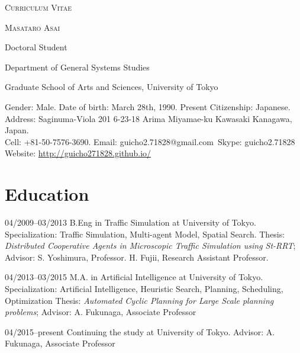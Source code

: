 \documentclass[letterpaper,12pt]{article}
\begin{document}
\pagestyle{empty}

\begin{center}
\huge{\textsc{Curriculum Vitae}}
\vspace{0.7\baselineskip}

\Large{\textsc{Masataro Asai}}
\vspace{0.5\baselineskip}

\large{
Doctoral Student

Department of General Systems Studies

Graduate School of Arts and Sciences, University of Tokyo
}

\vspace{0.8\baselineskip}

\normalsize{
 Gender: Male. Date of birth: March 28th, 1990. Present Citizenship: Japanese. \\
 Address: Saginuma-Viola 201 6-23-18 Arima Miyamae-ku Kawasaki Kanagawa, Japan. \\
 Cell: +81-50-7576-3690. Email: guicho2.71828@gmail.com\ Skype: guicho2.71828\\
 Website: \url{http://guicho271828.github.io/}}
\end{center}


\section{Education}

\begin{CV}
 \item[04/2009--03/2013] B.Eng in Traffic Simulation at University of Tokyo.
 Specialization: Traffic Simulation, Multi-agent Model, Spatial Search.
 {\small Thesis: \emph{Distributed Cooperative Agents in Microscopic
 Traffic Simulation using St-RRT}; Advisor: S. Yoshimura,
 Professor. H. Fujii, Research Assistant Professor.}

 \item[04/2013--03/2015] M.A. in Artificial Intelligence at University of Tokyo.
 Specialization: Artificial Intelligence, Heuristic Search, Planning, Scheduling, Optimization
 {\small Thesis: \emph{Automated Cyclic Planning for Large Scale planning problems};
 Advisor: A. Fukunaga, Associate Professor}

 \item[04/2015--present] Continuing the study at
 University of Tokyo. {\small Advisor: A. Fukunaga, Associate Professor}
\end{CV}
\end{document}
